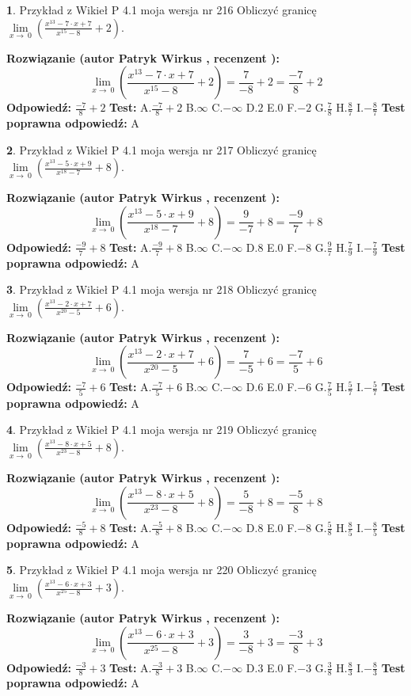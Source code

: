 \documentclass[12pt, a4paper]{article}
\theoremstyle{definition} %
\newtheorem{zad}{}
\newcommand{\zadStart}[1]{\begin{zad}#1\newline}
\newcommand{\zadStop}{\end{zad}}
\newcommand{\rozwStart}[2]{\noindent \textbf{Rozwiązanie (autor #1 , recenzent #2): }\newline}
\newcommand{\rozwStop}{\newline}
\newcommand{\odpStart}{\noindent \textbf{Odpowiedź:}\newline}
\newcommand{\odpStop}{\newline}
\newcommand{\testStart}{\noindent \textbf{Test:}\newline}
\newcommand{\testStop}{\newline}
\newcommand{\kluczStart}{\noindent \textbf{Test poprawna odpowiedź:}\newline}
\newcommand{\kluczStop}{\newline}
\begin{document}
\zadStart{Przykład z Wikieł P 4.1 moja wersja nr 216}
Obliczyć granicę $\lim\limits_{x\to\ 0}(\frac{x^{13}-7 \cdot x +7}{x^{15}-8}+2)$.
\zadStop
\rozwStart{Patryk Wirkus}{}
$$\lim\limits_{x\to\ 0}(\frac{x^{13}-7 \cdot x +7}{x^{15}-8}+2)=\frac{7}{-8}+2=\frac{-7}{8}+2$$
\rozwStop
\odpStart
$\frac{-7}{8}+2$
\odpStop
\testStart
A.$\frac{-7}{8}+2$
B.$\infty$
C.$-\infty$
D.$2$
E.$0$
F.$-2$
G.$\frac{7}{8}$
H.$\frac{8}{7}$
I.$-\frac{8}{7}$
\testStop
\kluczStart
A
\kluczStop



\zadStart{Przykład z Wikieł P 4.1 moja wersja nr 217}
Obliczyć granicę $\lim\limits_{x\to\ 0}(\frac{x^{13}-5 \cdot x +9}{x^{18}-7}+8)$.
\zadStop
\rozwStart{Patryk Wirkus}{}
$$\lim\limits_{x\to\ 0}(\frac{x^{13}-5 \cdot x +9}{x^{18}-7}+8)=\frac{9}{-7}+8=\frac{-9}{7}+8$$
\rozwStop
\odpStart
$\frac{-9}{7}+8$
\odpStop
\testStart
A.$\frac{-9}{7}+8$
B.$\infty$
C.$-\infty$
D.$8$
E.$0$
F.$-8$
G.$\frac{9}{7}$
H.$\frac{7}{9}$
I.$-\frac{7}{9}$
\testStop
\kluczStart
A
\kluczStop



\zadStart{Przykład z Wikieł P 4.1 moja wersja nr 218}
Obliczyć granicę $\lim\limits_{x\to\ 0}(\frac{x^{13}-2 \cdot x +7}{x^{20}-5}+6)$.
\zadStop
\rozwStart{Patryk Wirkus}{}
$$\lim\limits_{x\to\ 0}(\frac{x^{13}-2 \cdot x +7}{x^{20}-5}+6)=\frac{7}{-5}+6=\frac{-7}{5}+6$$
\rozwStop
\odpStart
$\frac{-7}{5}+6$
\odpStop
\testStart
A.$\frac{-7}{5}+6$
B.$\infty$
C.$-\infty$
D.$6$
E.$0$
F.$-6$
G.$\frac{7}{5}$
H.$\frac{5}{7}$
I.$-\frac{5}{7}$
\testStop
\kluczStart
A
\kluczStop



\zadStart{Przykład z Wikieł P 4.1 moja wersja nr 219}
Obliczyć granicę $\lim\limits_{x\to\ 0}(\frac{x^{13}-8 \cdot x +5}{x^{23}-8}+8)$.
\zadStop
\rozwStart{Patryk Wirkus}{}
$$\lim\limits_{x\to\ 0}(\frac{x^{13}-8 \cdot x +5}{x^{23}-8}+8)=\frac{5}{-8}+8=\frac{-5}{8}+8$$
\rozwStop
\odpStart
$\frac{-5}{8}+8$
\odpStop
\testStart
A.$\frac{-5}{8}+8$
B.$\infty$
C.$-\infty$
D.$8$
E.$0$
F.$-8$
G.$\frac{5}{8}$
H.$\frac{8}{5}$
I.$-\frac{8}{5}$
\testStop
\kluczStart
A
\kluczStop



\zadStart{Przykład z Wikieł P 4.1 moja wersja nr 220}
Obliczyć granicę $\lim\limits_{x\to\ 0}(\frac{x^{13}-6 \cdot x +3}{x^{25}-8}+3)$.
\zadStop
\rozwStart{Patryk Wirkus}{}
$$\lim\limits_{x\to\ 0}(\frac{x^{13}-6 \cdot x +3}{x^{25}-8}+3)=\frac{3}{-8}+3=\frac{-3}{8}+3$$
\rozwStop
\odpStart
$\frac{-3}{8}+3$
\odpStop
\testStart
A.$\frac{-3}{8}+3$
B.$\infty$
C.$-\infty$
D.$3$
E.$0$
F.$-3$
G.$\frac{3}{8}$
H.$\frac{8}{3}$
I.$-\frac{8}{3}$
\testStop
\kluczStart
A
\kluczStop
\end{document}
